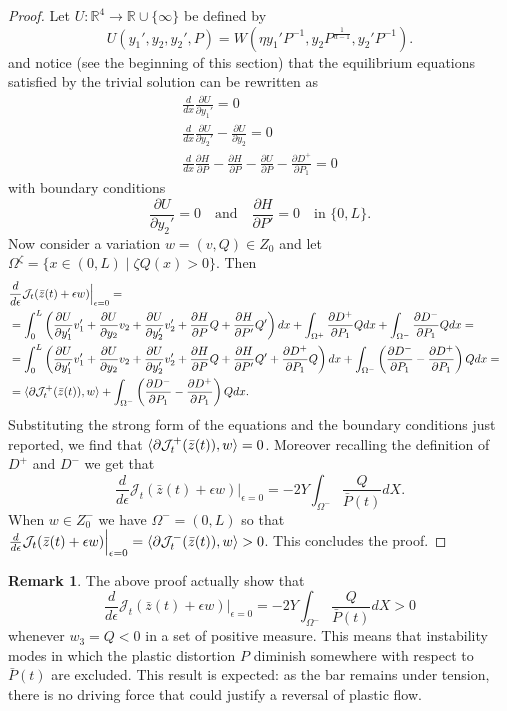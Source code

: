 \documentclass[a4paper,10pt,twoside]{amsbook}
\numberwithin{section}{chapter}
\numberwithin{equation}{chapter}
\theoremstyle{definition}
\newtheorem{rmk}[prop]{Remark}
\DeclarePairedDelimiter{\dual}{\langle}{\rangle}
\newcommand{\dind}[2]{\frac{\partial #1}{\partial #2}}
\begin{document}
\begin{proof}
Let $U\colon\mathbb{R}^4\to\mathbb{R}\cup\{\infty\}$ be defined by
\[
U(y_1',y_2,y_2',P)=W(\eta y_1'P^{-1},y_2P^\frac{1}{d-1},y_2'P^{-1}).
\]
and notice (see the beginning of this section) that the equilibrium equations satisfied by the trivial solution can be rewritten as
\begin{gather}
\frac{d}{dx}\dind{U}{y_1'}=0 \\
\frac{d}{dx}\dind{U}{y_2'}-\dind{U}{y_2}=0 \\
\frac{d}{dx}\dind{H}{P}-\dind{H}{P}-\dind{U}{P}-\dind{D^+}{P_1}=0
\end{gather}
with boundary conditions
\[
\dind{U}{y_2'}=0\quad\text{and}\quad\dind{H}{P'}=0\quad\text{in $\{0,L\}$}.
\]
Now consider a variation $w=(v,Q)\in Z_0$ and let $\Omega^\zeta=\{x\in(0,L)\;|\;\zeta Q(x)>0\}$. Then
\[
\begin{multlined}
\frac{d}{d\epsilon}\mathcal{J}_t(\bar z(t)+\epsilon w)\Big|_{\epsilon=0}=\\
\begin{split}
&=\int_0^L\left(\dind{U}{y_1'}v_1'+\dind{U}{y_2}v_2+\dind{U}{y_2'}v_2'+\dind{H}{P}Q+\dind{H}{P'}Q'\right)dx+\int_{\Omega^+}\dind{D^+}{P_1}Qdx+\int_{\Omega^-}\dind{D^-}{P_1}Qdx=\\
&=\int_0^L\left(\dind{U}{y_1'}v_1'+\dind{U}{y_2}v_2+\dind{U}{y_2'}v_2'+\dind{H}{P}Q+\dind{H}{P'}Q'+\dind{D^+}{P_1}Q\right)dx+\int_{\Omega^-}\left(\dind{D^-}{P_1}-\dind{D^+}{P_1}\right)Qdx=\\
&=\dual{\partial\mathcal{J}^+_t(\bar z(t)),w}+\int_{\Omega^-}\left(\dind{D^-}{P_1}-\dind{D^+}{P_1}\right)Qdx.
\end{split}
\end{multlined}
\]
Substituting the strong form of the equations and the boundary conditions just reported, we find that $\dual{\partial\mathcal{J}^+_t(\bar z(t)),w}=0$. Moreover recalling the definition of $D^+$ and $D^-$ we get that
\[
\frac{d}{d\epsilon}\mathcal{J}_t(\bar z(t)+\epsilon w)\Big|_{\epsilon=0}=-2Y\int_{\Omega^-}\frac{Q}{\bar P(t)}dX.
\]
When $w\in Z_0^-$ we have $\Omega^-=(0,L)$ so that $\frac{d}{d\epsilon}\mathcal{J}_t(\bar z(t)+\epsilon w)\Big|_{\epsilon=0}=\dual{\partial\mathcal{J}_t^-(\bar z(t)),w}>0$. This concludes the proof.
\end{proof}
\begin{rmk}
The above proof actually show that
\[
\frac{d}{d\epsilon}\mathcal{J}_t(\bar z(t)+\epsilon w)\Big|_{\epsilon=0}=-2Y\int_{\Omega^-}\frac{Q}{\bar P(t)}dX>0
\]
whenever $w_3=Q<0$ in a set of positive measure. This means that instability modes in which the plastic distortion $P$ diminish somewhere with respect to $\bar P(t)$ are excluded. This result is expected: as the bar remains under tension, there is no driving force that could justify a reversal of plastic flow.
\end{rmk}
\end{document}
